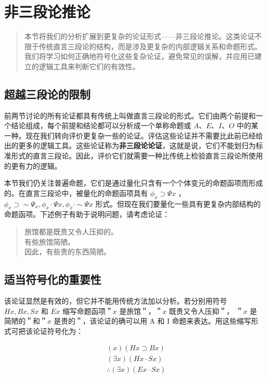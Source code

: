 \section{非三段论推论}

\begin{quotation}
本节将我们的分析扩展到更复杂的论证形式——非三段论推论。这类论证不限于传统直言三段论的结构，而是涉及更复杂的内部逻辑关系和命题形式。我们将学习如何正确地符号化这些复杂论证，避免常见的误解，并应用已建立的逻辑工具来判断它们的有效性。
\end{quotation}

\subsection{超越三段论的限制}

前两节讨论的所有论证都具有传统上叫做直言三段论的形式。它们由两个前提和一个结论组成，每个前提和结论都可以分析成一个单称命题或 $A 、 E 、 I 、 O$ 中的某一种。现在我们转向评价更复杂一些的论证。评估这些论证并不需要比此前已经给出的更多的逻辑工具。这些论证称为\textbf{非三段论论证}，这就是说，它们不能划归为标准形式的直言三段论。因此，评价它们就需要一种比传统上检验直言三段论所使用的更有力的逻辑。

本节我们仍关注普遍命题，它们是通过量化只含有一个个体变元的命题函项而形成的。在直言三段论中，被量化的命题函项具有 $\phi_{x} \supset \Psi x$ ， $\phi_{x} \supset \sim \Psi_{x}, \phi_{x} \cdot \Psi x, \phi_{x} \cdot \sim \Psi x$ 形式。但现在我们要量化一些具有更复杂内部结构的命题函项。下述例子有助于说明问题，请考虑论证：

\begin{quote}
旅馆都是既贵又令人压抑的。\\
有些旅馆简陋。\\
因此，有些贵的东西简陋。
\end{quote}

\subsection{适当符号化的重要性}

该论证显然是有效的，但它并不能用传统方法加以分析。若分别用符号 $H x, B x, S x$ 和 $E x$ 缩写命题函项＂$x$ 是旅馆＂，＂$x$ 既贵又令人压抑＂， ＂$x$ 是简陋的＂和＂$x$ 是贵的＂，该论证的确可以用 A 和 I 命题来表达。\cite{lukasiewicz1951}用这些缩写形式可把该论证符号化为：

$$
\begin{aligned}
& (x)(H x \supset B x) \\
& (\exists x)(H x \cdot S x) \\
& \therefore(\exists x)(E x \cdot S x)
\end{aligned}
$$


